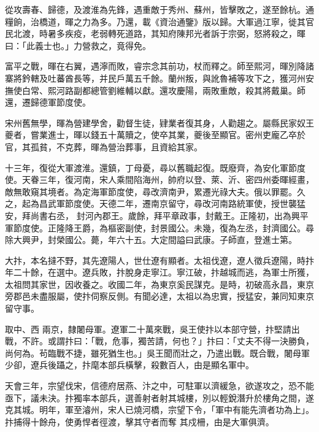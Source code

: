 \begin{pinyinscope}
 從攻壽春、歸德，及渡淮為先鋒，遇重敵于秀州、蘇州，皆擊敗之，遂至餘杭。通糧餉，治橋道，暉之力為多。乃還，載《資治通鑒》版以歸。大軍過江寧，徙其官民北渡，時暑多疾疫，老弱轉死道路，其知府陳邦光者訴于宗弼，怒將殺之，暉曰：「此義士也。」力營救之，竟得免。



 富平之戰，暉在右翼，遇濘而敗，睿宗念其前功，杖而釋之。師至熙河，暉別降諸寨將鈐轄及吐蕃酋長等，并民戶萬五千餘。蘭州叛，與訛魯補等攻下之，獲河州安撫使白常、熙河路副都總管劉維輔以獻。還攻慶陽，兩敗重敵，殺其將戴巢。師
 還，遷歸德軍節度使。



 宋州舊無學，暉為營建學舍，勸督生徒，肄業者復其身，人勸趨之。屬縣民家奴王夔者，嘗業進士，暉以錢五十萬贖之，使卒其業，夔後至顯官。密州吏龐乙卒於官，其孤貧，不克葬，暉為營治葬事，且資給其家。



 十三年，復從大軍渡淮。還鎮，丁母憂，尋以舊職起復。既廢齊，為安化軍節度使。天眷三年，復河南，宋人乘間陷海州，帥府以登、萊、沂、密四州委暉經畫，敵無敢窺其境者。為定海軍節度使，尋改濟南尹，累遷光祿大夫。俄以罪罷。久之，起為昌武軍節度使。天德二年，遷南京留守，尋改河南路統軍使，授世襲猛安，拜尚書右丞，
 封河內郡王。歲餘，拜平章政事，封戴王。正隆初，出為興平軍節度使。正隆降王爵，為樞密副使，封景國公。未幾，復為左丞，封濟國公。尋除大興尹，封榮國公。薨，年六十五。大定間謚曰武康。子師直，登進士第。



 大抃，本名撻不野，其先遼陽人，世仕遼有顯者。太祖伐遼，遼人徵兵遼陽，時抃年二十餘，在選中。遼兵敗，抃脫身走寧江。寧江破，抃越城而逃，為軍士所獲，太祖問其家世，因收養之。收國二年，為東京奚民謀克。是時，初破高永昌，東京旁郡邑未盡服屬，使抃伺察反側。有聞必達，太祖以為忠實，授猛安，兼同知東京留守事。



 取中、西
 兩京，隸闍母軍。遼軍二十萬來戰，吳王使抃以本部守營，抃堅請出戰，不許。或謂抃曰：「戰，危事，獨苦請，何也？」抃曰：「丈夫不得一決勝負，尚何為。茍臨戰不捷，雖死猶生也。」吳王聞而壯之，乃遣出戰。既合戰，闍母軍少卻，遼兵後躡之，抃麾本部兵橫擊，殺數百人，由是顯名軍中。



 天會三年，宗望伐宋，信德府居燕、汴之中，可駐軍以濟緩急，欲遂攻之，恐不能亟下，議未決。抃獨率本部兵，選善射者射其城樓，別以輕銳潛升於樓角之間，遂克其城。明年，軍至濬州，宋人已燒河橋，宗望下令，「軍中有能先濟者功為上」。抃捕得十餘舟，使勇悍者徑渡，擊其守者而奪
 其戍柵，由是大軍俱濟。




\end{pinyinscope}
